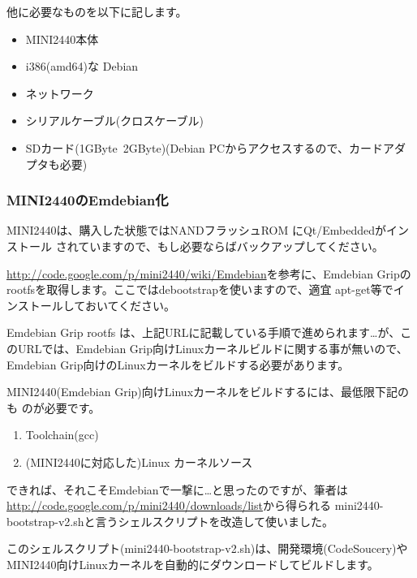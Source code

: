 \documentclass[mingoth,a4paper]{jsarticle}
\begin{document}
他に必要なものを以下に記します。
\begin{itemize}
 \item MINI2440本体
 \item i386(amd64)な Debian
 \item ネットワーク
 \item シリアルケーブル(クロスケーブル)
 \item SDカード(1GByte~2GByte)(Debian PCからアクセスするので、カードアダプタも必要)
\end{itemize}

\subsubsection{MINI2440のEmdebian化}


MINI2440は、購入した状態ではNANDフラッシュROM にQt/Embeddedがインストール
されていますので、もし必要ならばバックアップしてください。


\url{http://code.google.com/p/mini2440/wiki/Emdebian}を参考に、Emdebian
Gripのrootfsを取得します。ここではdebootstrapを使いますので、適宜
apt-get等でインストールしておいてください。

Emdebian Grip rootfs は、上記URLに記載している手順で進められます…が、こ
のURLでは、Emdebian Grip向けLinuxカーネルビルドに関する事が無いので、
Emdebian Grip向けのLinuxカーネルをビルドする必要があります。


MINI2440(Emdebian Grip)向けLinuxカーネルをビルドするには、最低限下記のも
のが必要です。

\begin{enumerate}
 \item Toolchain(gcc)
 \item (MINI2440に対応した)Linux カーネルソース
\end{enumerate}

できれば、それこそEmdebianで一撃に…と思ったのですが、筆者は
\url{http://code.google.com/p/mini2440/downloads/list}から得られる
mini2440-bootstrap-v2.shと言うシェルスクリプトを改造して使いました。

このシェルスクリプト(mini2440-bootstrap-v2.sh)は、開発環境(CodeSoucery)や
MINI2440向けLinuxカーネルを自動的にダウンロードしてビルドします。
\end{document}
